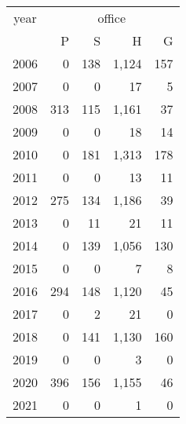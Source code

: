 \footnotesize\begin{tabular}[t]{lrrrr}
\toprule
\multicolumn{1}{c}{year} & \multicolumn{4}{c}{office} \\
\cmidrule(l{3pt}r{3pt}){1-1} \cmidrule(l{3pt}r{3pt}){2-5}
  & P & S & H & G\\
\midrule
2006 & 0 & 138 & 1,124 & 157\\
2007 & 0 & 0 & 17 & 5\\
2008 & 313 & 115 & 1,161 & 37\\
2009 & 0 & 0 & 18 & 14\\
2010 & 0 & 181 & 1,313 & 178\\
2011 & 0 & 0 & 13 & 11\\
2012 & 275 & 134 & 1,186 & 39\\
2013 & 0 & 11 & 21 & 11\\
2014 & 0 & 139 & 1,056 & 130\\
2015 & 0 & 0 & 7 & 8\\
2016 & 294 & 148 & 1,120 & 45\\
2017 & 0 & 2 & 21 & 0\\
2018 & 0 & 141 & 1,130 & 160\\
2019 & 0 & 0 & 3 & 0\\
2020 & 396 & 156 & 1,155 & 46\\
2021 & 0 & 0 & 1 & 0\\
\bottomrule
\end{tabular}

